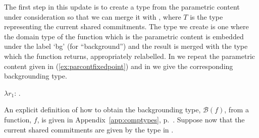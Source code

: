 The first step in this update is to create a type from the parametric
content under consideration so that we can merge it with
, where $T$ is the type
representing the current shared commitments.  The type we create is
one where the domain type of the function which is the parametric
content is embedded under the label `bg' (for ``background'') and the
result is merged with the type which the function returns,
appropriately relabelled.  In  we repeat the parametric
content given in (\ref{ex:parcontfixedpoint}) and in  we
give the corresponding backgrounding type. 
\begin{ex} 
\begin{subex} 
 
\item $\lambda
  r_1$: . 
 
\item {} 
 
\end{subex} 
   
\end{ex}
An explicit definition of how to obtain the backgrounding type, $\mathcal{B}(f)$, from
a function, $f$, is given in Appendix~\ref{app:comptypes},
p.~\pageref{pg:backgroundingtype}. Suppose now that the current shared
commitments are given by the type in \nexteg{}.

